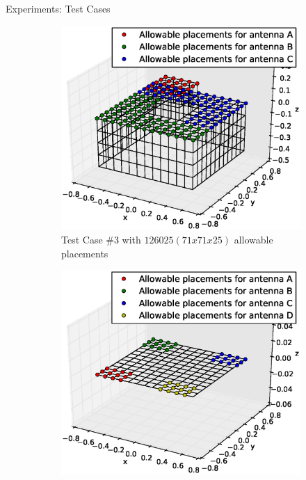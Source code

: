 \documentclass{beamer}
\begin{document}
\begin{frame}{Experiments: Test Cases}
    \begin{figure}
        \centering
        \begin{subfigure}{.5\columnwidth}
            \includegraphics[width=\columnwidth,height=\columnwidth]{../paper/FIG/tc3_figure}%
            \caption*{\tiny Test Case \#3 with $126025 (71x71x25)$ allowable placements}%
        \end{subfigure}\hfill%
        \begin{subfigure}{.5\columnwidth}
            \includegraphics[width=\columnwidth, height=\columnwidth]{../paper/FIG/tc4_figure}%

\end{subfigure}
\end{figure}
\end{frame}
\end{document}
